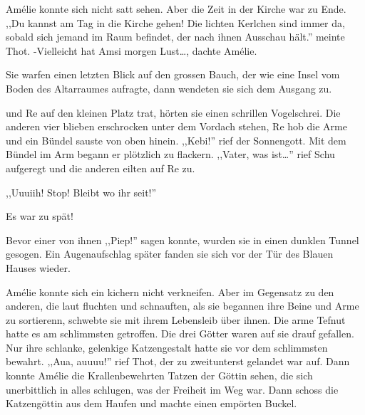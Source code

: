 \documentclass[11pt,titlepage,a5paper]{book}
\begin{document}
Amélie konnte sich nicht satt sehen. Aber die Zeit in der Kirche war zu Ende. ,,Du kannst am Tag in die Kirche gehen! Die lichten Kerlchen sind immer da, sobald sich jemand im Raum befindet, der nach ihnen Ausschau hält.'' meinte Thot. -Vielleicht hat Amsi morgen Lust\dots, dachte Amélie.

Sie warfen einen letzten Blick auf den grossen Bauch, der wie eine Insel vom Boden des Altarraumes aufragte, dann wendeten sie sich dem Ausgang zu.

und Re auf den kleinen Platz trat, hörten sie einen schrillen Vogelschrei. Die anderen vier blieben erschrocken unter dem Vordach stehen, Re hob die Arme und ein Bündel sauste von oben hinein. ,,Kebi!'' rief der Sonnengott. Mit dem Bündel im Arm begann er plötzlich zu flackern. ,,Vater, was ist\dots'' rief Schu aufgeregt und die anderen eilten auf Re zu.
\begin{Large},,Uuuiih! Stop! Bleibt wo ihr seit!''\end{Large} Es war zu spät!

Bevor einer von ihnen ,,Piep!'' sagen konnte, wurden sie in einen dunklen Tunnel gesogen. Ein Augenaufschlag später fanden sie sich vor der Tür des Blauen Hauses wieder.

Amélie konnte sich ein kichern nicht verkneifen. Aber im Gegensatz zu den anderen, die laut fluchten und schnauften,  als sie begannen ihre Beine und Arme zu sortierenn, schwebte sie mit ihrem Lebensleib über ihnen. Die arme Tefnut hatte es am schlimmsten getroffen. Die drei Götter waren auf sie drauf gefallen. Nur ihre schlanke, gelenkige Katzengestalt hatte sie vor dem schlimmsten bewahrt. ,,Aua, auuuu!'' rief Thot, der zu zweitunterst gelandet war auf. Dann konnte Amélie die Krallenbewehrten Tatzen der Göttin sehen, die sich unerbittlich in alles schlugen, was der Freiheit im Weg war. Dann schoss die Katzengöttin aus dem Haufen und machte einen empörten Buckel.

\tableofcontents


{}

\end{document}
